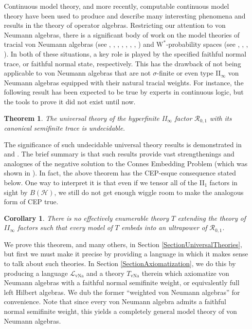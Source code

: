 \documentclass[12pt]{amsart}
\newtheorem*{thm*}{Theorem}
\newtheorem*{cor*}{Corollary}
\theoremstyle{definition}
\def\cal{\mathcal}
\newcommand{\wstar}{$\mathrm{W}^*$}
\DeclareMathOperator{\vNa}{vNa}
\newcommand\R{{\cal R}}
\begin{document}
Continuous model theory, and more recently, computable continuous model theory have been used to produce and describe many interesting phenomena and results in the theory of operator algebras.  Restricting our attention to von Neumann algebras, there is a significant body of work on the model theories of tracial von Neumann algebras (see \cite{FG}, \cite{FHS1}, \cite{FHS2}, \cite{FHS3}, \cite{GaoJekel}, \cite{GHHyp}, \cite{GH}, \cite{GH2}) and \wstar-probability spaces (see \cite{AGH}, \cite{AGHS}, \cite{Dab}, \cite{GoldbringHoudayer}).  In both of these situations, a key role is played by the specified faithful normal trace, or faithful normal state, respectively.  This has the drawback of not being applicable to von Neumann algebras that are not $\sigma$-finite or even type II$_\infty$ von Neumann algebras equipped with their natural tracial weights.  For instance, the following result has been expected to be true by experts in continuous logic, but the tools to prove it did not exist until now.

\begin{thm*}
    The universal theory of the hyperfinite II$_\infty$ factor $\R_{0,1}$ with its canonical semifinite trace is undecidable.
\end{thm*}  

The significance of such undecidable universal theory results is demonstrated in \cite{GH2} and \cite{AGH}.  The brief summary is that such results provide vast strengthenings and analogues of the negative solution to the Connes Embedding Problem (which was shown in \cite{MIP}).  In fact, the above theorem has the CEP-esque consequence stated below.  One way to interpret it is that even if we tensor all of the II$_1$ factors in sight by $B(\cal H)$, we still do not get enough wiggle room to make the analogous form of CEP true.

\begin{cor*}
    There is no effectively enumerable theory $T$ extending the theory of $II_{\infty}$ factors such that every model of $T$ embeds into an ultrapower of $\R_{0,1}$.
\end{cor*}

We prove this theorem, and many others, in Section \ref{SectionUniversalTheories}, but first we must make it precise by providing a language in which it makes sense to talk about such theories.  In Section \ref{SectionAxiomatization}, we do this by producing a language $\cal L_{\vNa}$ and a theory $T_{\vNa}$ therein which axiomatize von Neumann algebras with a faithful normal semifinite weight, or equivalently full left Hilbert algebras.  We dub the former ``weighted von Neumann algebras'' for convenience.  Note that since every von Neumann algebra admits a faithful normal semifinite weight, this yields a completely general model theory of von Neumann algebras.
\end{document}
